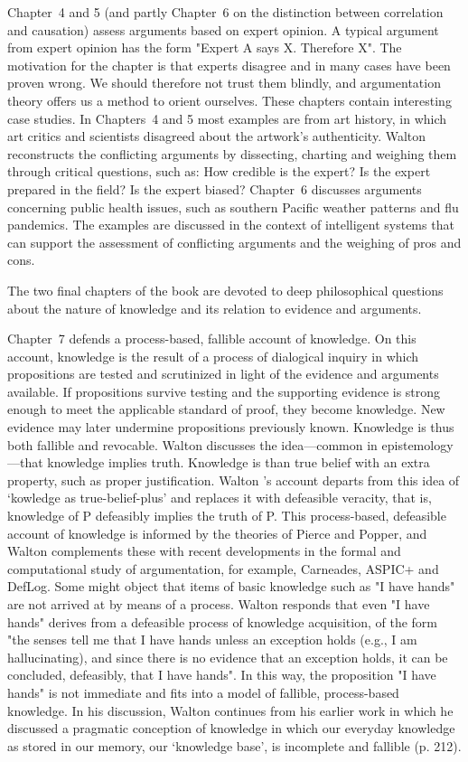 \documentclass[12pt]{article}
\begin{document}
Chapter~4 and 5 (and partly Chapter~6 on the distinction between
correlation and causation) assess arguments based on expert opinion.
A typical argument from
expert opinion has the form "Expert A says X. Therefore X". The motivation for the chapter is that experts
disagree and in many cases have been proven wrong. We should therefore not
trust them blindly, and argumentation theory offers us a method to
orient ourselves. These chapters contain interesting case studies. In Chapters~4 and 5 most examples are 
from art history, in which art critics and scientists disagreed about
the artwork's authenticity. Walton reconstructs the conflicting
arguments by dissecting, charting and weighing them through critical
questions, such as: How credible is the expert? Is the expert prepared
in the field? Is the expert biased? Chapter~6 discusses arguments concerning public health issues, such as southern Pacific weather patterns and flu pandemics. The examples are discussed in the context of 
intelligent systems that can support the assessment of
conflicting arguments and the weighing of pros and cons.

The two final chapters of the book are devoted to deep philosophical
questions about the nature of knowledge and its relation to evidence and arguments.

Chapter~7 defends a process-based, fallible account of knowledge. On
this account, knowledge is the result of a process of dialogical inquiry in which
propositions are tested and scrutinized in light of the evidence and arguments
available. If propositions survive testing and the supporting evidence is
strong enough to meet the applicable standard of proof, they become
knowledge. New evidence may later undermine propositions
previously known. Knowledge is thus both fallible and revocable.
Walton discusses the idea---common in epistemology---that knowledge implies
truth. Knowledge is than true belief with an extra property, such as proper justification.
Walton
's account departs from this idea of `kowledge as true-belief-plus' and replaces it with defeasible veracity, that is, knowledge of
P defeasibly implies the truth of P. 
This process-based, defeasible
account of knowledge is informed by the theories of Pierce and Popper,
and Walton complements these with recent developments in the formal and computational study of argumentation,
for example, Carneades, ASPIC+ and DefLog.
Some might object that items of basic knowledge such as "I have hands"
are not arrived at by means of a process. Walton responds that even "I
have hands" derives from a defeasible process of knowledge
acquisition, of the form "the senses tell me that I have hands unless
an exception holds (e.g., I am hallucinating), and since there is no
evidence that an exception holds, it can be concluded, defeasibly,
that I have hands". In this way, the proposition "I have hands" is not immediate and fits into a model of fallible, process-based
knowledge. In his discussion, Walton continues from his earlier work in which he discussed a pragmatic conception of knowledge in which our everyday knowledge as stored in our memory, our `knowledge base', is incomplete and fallible (p. 212).
\end{document}

